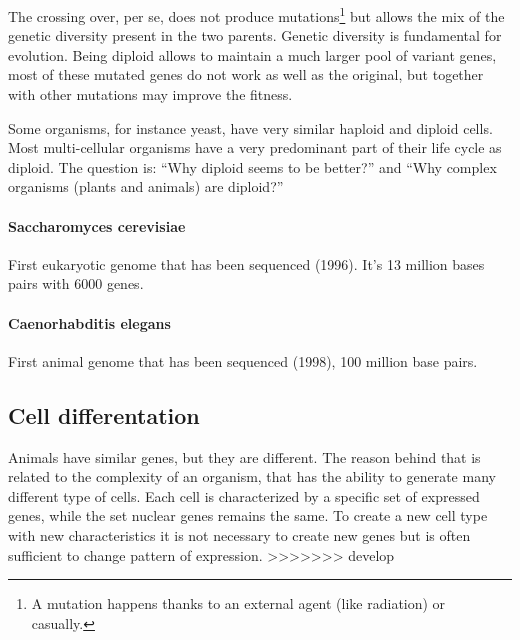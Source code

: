 The crossing over, per se, does not produce mutations\footnote{A mutation
happens thanks to an external agent (like radiation) or casually.} but allows
the mix of the genetic diversity present in the two parents. Genetic diversity
is fundamental for evolution. Being diploid allows to maintain a much larger
pool of variant genes, most of these mutated genes do not work as well as the
original, but together with other mutations may improve the fitness.

Some organisms, for instance yeast, have very similar haploid and diploid
cells. Most multi-cellular organisms have a very predominant part of their life
cycle as diploid. The question is: ``Why diploid seems to be better?'' and ``Why
complex organisms (plants and animals) are diploid?''

\paragraph*{Saccharomyces cerevisiae}
First eukaryotic genome that has been sequenced (1996). It's 13 million bases
pairs with 6000 genes.

\paragraph*{Caenorhabditis elegans}
First animal genome that has been sequenced (1998), 100 million base pairs.

\subsection{Cell differentation}

Animals have similar genes, but they are different. The reason behind that is
related to the complexity of an organism, that has the ability to generate many
different type of cells.
Each cell is characterized by a specific set of expressed genes, while the set
nuclear genes remains the same. To create a new cell type with new
characteristics it is not necessary to create new genes but is often sufficient
to change pattern of expression.
>>>>>>> develop
